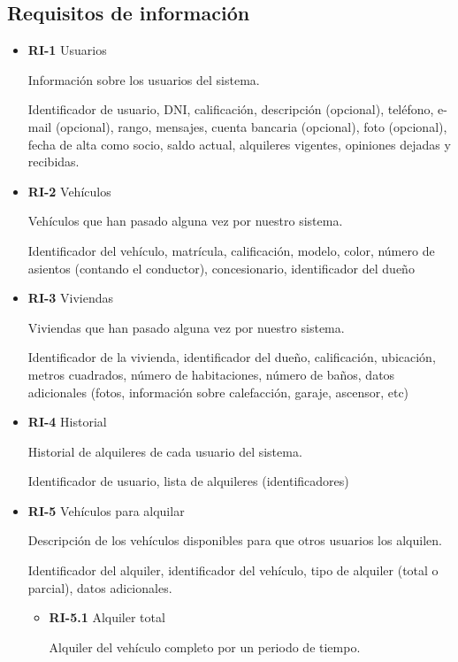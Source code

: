 \documentclass[11pt,spanish]{article} %
\begin{document}
\subsection{Requisitos de información}
\begin{itemize}
	\item \textbf{RI-1} Usuarios
	
	Información sobre los usuarios del sistema.
	
	Identificador de usuario, DNI, calificación, descripción (opcional), teléfono, e-mail (opcional), rango, mensajes, cuenta bancaria (opcional), foto (opcional), fecha de alta como socio, saldo actual, alquileres vigentes, opiniones dejadas y recibidas.
	
	\item \textbf{RI-2} Vehículos
	
	Vehículos que han pasado alguna vez por nuestro sistema.
	
	Identificador del vehículo, matrícula, calificación, modelo, color, número de asientos (contando el conductor), concesionario, identificador del dueño
	
	\item \textbf{RI-3} Viviendas
	
	Viviendas que han pasado alguna vez por nuestro sistema.
	
	Identificador de la vivienda, identificador del dueño, calificación, ubicación, metros cuadrados, número de habitaciones, número de baños, datos adicionales (fotos, información sobre calefacción, garaje, ascensor, etc)
	
	\item \textbf{RI-4} Historial
	
	Historial de alquileres de cada usuario del sistema.
	
	Identificador de usuario, lista de alquileres (identificadores)
		
	\item \textbf{RI-5} Vehículos para alquilar
	
	Descripción de los vehículos disponibles para que otros usuarios los alquilen.
	
	Identificador del alquiler, identificador del vehículo, tipo de alquiler (total o parcial), datos adicionales.
	\begin{itemize}
		\item \textbf{RI-5.1} Alquiler total
		
		Alquiler del vehículo completo por un periodo de tiempo.
		

\end{itemize}
\end{itemize}
\end{document}
